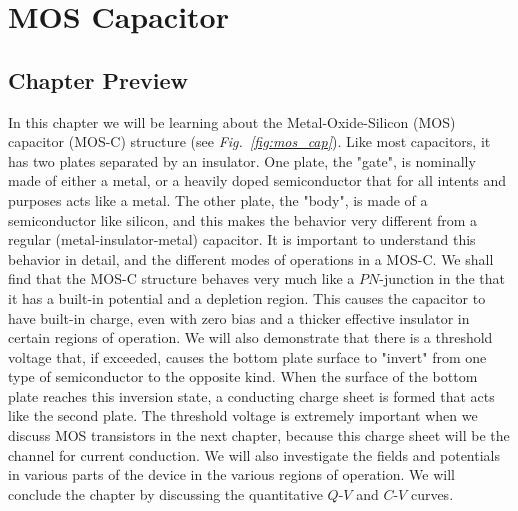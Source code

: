 \chapter{MOS Capacitor}
\label{ch:ch07_mos_c}
\graphicspath{{./figs_MOS_C/}}
\section{Chapter Preview}
In this chapter we will be learning about the Metal-Oxide-Silicon (MOS) capacitor (MOS-C) structure (see \emph{Fig.~\ref{fig:mos_cap}}). Like most capacitors, it has two plates separated by an insulator.  One plate, the "gate", is nominally made of either a metal, or a heavily doped semiconductor that for all intents and purposes acts like a metal.  The other plate, the "body",  is made of a semiconductor like silicon, and this makes the behavior very different from a regular (metal-insulator-metal) capacitor. It is important to understand this behavior in detail, and the different modes of operations in a MOS-C.  We shall find that the MOS-C structure behaves very much like a $PN$-junction in the that it has a built-in potential and a depletion region.  This causes the capacitor to have built-in charge, even with zero bias and a thicker effective insulator in certain regions of operation.  We will also demonstrate that there is a threshold voltage that, if exceeded, causes the bottom plate surface to "invert" from one type of semiconductor to the opposite kind.  When the surface of the bottom plate reaches this inversion state, a conducting charge sheet is formed that acts like the second plate.  The threshold voltage is extremely important when we discuss MOS transistors in the next chapter, because this charge sheet will be the channel for current conduction.  We will also investigate the fields and potentials in various parts of the device in the various regions of operation.  We will conclude the chapter by discussing the quantitative $Q$-$V$ and $C$-$V$ curves.
\newpage
